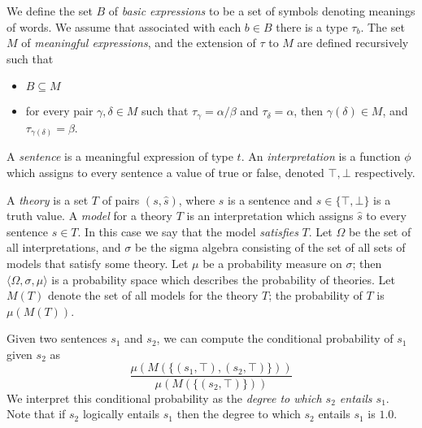 \documentclass[letterpaper]{article}
\begin{document}
We define the set $B$ of \emph{basic expressions} to be a set of
symbols denoting meanings of words. We assume that associated with
each $b\in B$ there is a type $\tau_b$. The set $M$ of
\emph{meaningful expressions}, and the extension of $\tau$ to $M$ are
defined recursively such that
\begin{itemize}
\item $B\subseteq M$
\item for every pair $\gamma,\delta\in M$ such that $\tau_\gamma =
  \alpha/\beta$ and $\tau_\delta = \alpha$, then $\gamma(\delta)\in
  M$, and $\tau_{\gamma(\delta)} = \beta$.
\end{itemize}

A \emph{sentence} is a meaningful expression of type $t$. An
\emph{interpretation} is a function $\phi$ which assigns to every
sentence a value of true or false, denoted $\top, \bot$ respectively.

A \emph{theory} is a set $T$ of pairs $(s,\hat{s})$, where $s$ is a
sentence and $\hat{s}\in\{\top,\bot\}$ is a truth value. A
\emph{model} for a theory $T$ is an interpretation which assigns
$\hat{s}$ to every sentence $s\in T$. In this case we say that the model \emph{satisfies} $T$. Let $\Omega$ be the set of all
interpretations, and $\sigma$ be the sigma algebra consisting of the
set of all sets of models that satisfy some theory. Let $\mu$ be a probability measure
on $\sigma$; then $\langle\Omega,\sigma,\mu\rangle$ is a probability
space which describes the probability of theories. Let $M(T)$ denote
the set of all models for the theory $T$; the probability of $T$ is
$\mu(M(T))$.

Given two sentences $s_1$ and $s_2$, we can compute the conditional
probability of $s_1$ given $s_2$ as
$$\frac{\mu(M(\{(s_1, \top), (s_2, \top)\}))}{\mu(M(\{(s_2,\top)\}))}$$
We interpret this conditional probability as the {\em degree to which $s_2$ entails $s_1$\/}. Note that if $s_2$ logically entails $s_1$ then the degree to which  $s_2$ entails $s_1$ is $1.0$.

\end{document}
